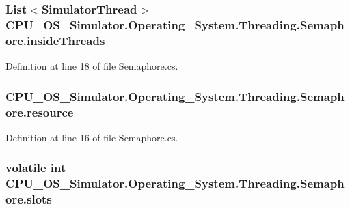 \subsubsection[{inside\+Threads}]{\setlength{\rightskip}{0pt plus 5cm}List$<${\bf Simulator\+Thread}$>$ C\+P\+U\+\_\+\+O\+S\+\_\+\+Simulator.\+Operating\+\_\+\+System.\+Threading.\+Semaphore.\+inside\+Threads\hspace{0.3cm}{\ttfamily [private]}}\label{class_c_p_u___o_s___simulator_1_1_operating___system_1_1_threading_1_1_semaphore_ae3abcf563abc5ec4c98b4df6a57a25fc}


Definition at line 18 of file Semaphore.\+cs.

\hypertarget{class_c_p_u___o_s___simulator_1_1_operating___system_1_1_threading_1_1_semaphore_a9e455411df1e6ee61e1479f63767771c}{}
\subsubsection[{resource}]{ C\+P\+U\+\_\+\+O\+S\+\_\+\+Simulator.\+Operating\+\_\+\+System.\+Threading.\+Semaphore.\+resource\hspace{0.3cm}{\ttfamily [private]}}\label{class_c_p_u___o_s___simulator_1_1_operating___system_1_1_threading_1_1_semaphore_a9e455411df1e6ee61e1479f63767771c}


Definition at line 16 of file Semaphore.\+cs.

\hypertarget{class_c_p_u___o_s___simulator_1_1_operating___system_1_1_threading_1_1_semaphore_af038c196aad3640c1342b6cd5e67c758}{}
\subsubsection[{slots}]{\setlength{\rightskip}{0pt plus 5cm}volatile int C\+P\+U\+\_\+\+O\+S\+\_\+\+Simulator.\+Operating\+\_\+\+System.\+Threading.\+Semaphore.\+slots\hspace{0.3cm}{\ttfamily [private]}}\label{class_c_p_u___o_s___simulator_1_1_operating___system_1_1_threading_1_1_semaphore_af038c196aad3640c1342b6cd5e67c758}


